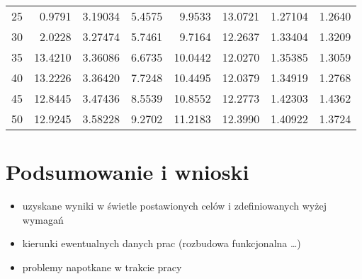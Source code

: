 \documentclass[a4paper,twoside,12pt]{book}
\begin{document}
\begin{table}
\begin{tabular}{rrrrrrrr}
		25      & 0.9791                     & 3.19034 & 5.4575                     & 9.9533                                   & 13.0721     & 1.27104       & 1.2640         \\
		30      & 2.0228                     & 3.27474 & 5.7461                     & 9.7164                                   & 12.2637     & 1.33404       & 1.3209         \\
		35      & 13.4210                    & 3.36086 & 6.6735                     & 10.0442                                  & 12.0270     & 1.35385       & 1.3059         \\
		40      & 13.2226                    & 3.36420 & 7.7248                     & 10.4495                                  & 12.0379     & 1.34919       & 1.2768         \\
		45      & 12.8445                    & 3.47436 & 8.5539                     & 10.8552                                  & 12.2773     & 1.42303       & 1.4362         \\
		50      & 12.9245                    & 3.58228 & 9.2702                     & 11.2183                                  & 12.3990     & 1.40922       & 1.3724         \\
		\bottomrule
	\end{tabular}
\end{table}



\chapter{Podsumowanie i wnioski}
\begin{itemize}
	\item uzyskane wyniki w świetle postawionych celów i zdefiniowanych wyżej wymagań
	\item kierunki ewentualnych danych prac (rozbudowa funkcjonalna …)
	\item problemy napotkane w trakcie pracy
\end{itemize}



\backmatter

\printbibliography           %
\end{document}
